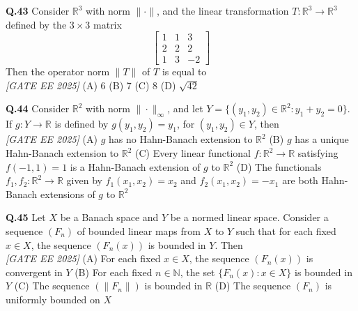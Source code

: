 \documentclass[11pt]{article}
\begin{document}
\begin{flushleft}
\textbf{Q.43} Consider $\mathbb{R}^3$ with norm $\|\cdot\|$, and the linear transformation $T : \mathbb{R}^3 \to \mathbb{R}^3$ defined by the $3 \times 3$ matrix \newline
\[
\begin{bmatrix}
1 & 1 & 3 \\
2 & 2 & 2 \\
1 & 3 & -2
\end{bmatrix}
\]
Then the operator norm $\|T\|$ of $T$ is equal to
\\[1ex] \textit{[GATE EE 2025]}
\newline
(A) 6 \hspace{3em} (B) 7 \hspace{3em} (C) 8 \hspace{3em} (D) $\sqrt{42}$ \newline
\end{flushleft}

\begin{flushleft}
\textbf{Q.44} Consider $\mathbb{R}^2$ with norm $\|\cdot\|_{\infty}$, and let $Y = \{(y_1, y_2) \in \mathbb{R}^2 : y_1 + y_2 = 0\}$. If $g: Y \to \mathbb{R}$ is defined by $g(y_1, y_2) = y_1$, for $(y_1, y_2) \in Y$, then 
\\[1ex] \textit{[GATE EE 2025]}
\newline
(A) $g$ has no Hahn-Banach extension to $\mathbb{R}^2$ \newline
(B) $g$ has a unique Hahn-Banach extension to $\mathbb{R}^2$ \newline
(C) Every linear functional $f : \mathbb{R}^2 \to \mathbb{R}$ satisfying $f(-1, 1) = 1$ is a Hahn-Banach extension of $g$ to $\mathbb{R}^2$ \newline
(D) The functionals $f_1, f_2 : \mathbb{R}^2 \to \mathbb{R}$ given by $f_1(x_1, x_2) = x_2$ and $f_2(x_1, x_2) = -x_1$ are both Hahn-Banach extensions of $g$ to $\mathbb{R}^2$ \newline
\end{flushleft}

\begin{flushleft}
\textbf{Q.45} Let $X$ be a Banach space and $Y$ be a normed linear space. Consider a sequence $(F_n)$ of bounded linear maps from $X$ to $Y$ such that for each fixed $x \in X$, the sequence $(F_n(x))$ is bounded in $Y$. Then 
\\[1ex] \textit{[GATE EE 2025]}
\newline
(A) For each fixed $x \in X$, the sequence $(F_n(x))$ is convergent in $Y$ \newline
(B) For each fixed $n \in \mathbb{N}$, the set $\{F_n(x): x \in X\}$ is bounded in $Y$ \newline
(C) The sequence $(\|F_n\|)$ is bounded in $\mathbb{R}$ \newline
(D) The sequence $(F_n)$ is uniformly bounded on $X$ \newline
\end{flushleft}
\end{document}
